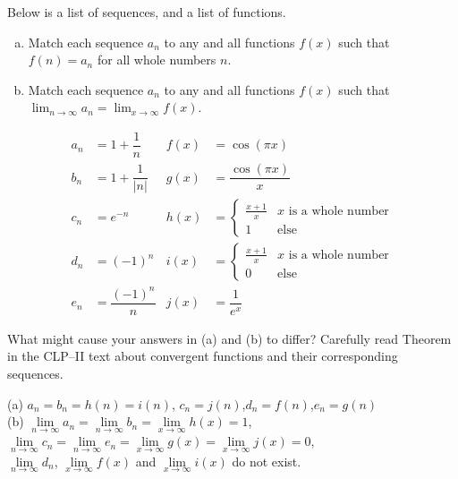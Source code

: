 \begin{Mquestion}
Below is a list of sequences, and a list of functions.
\begin{enumerate}[(a)]
\item Match each sequence $a_n$ to any and all functions $f(x)$ such that $f(n)=a_n$ for all whole numbers $n$.
\item Match each sequence $a_n$ to any and all functions $f(x)$ such that $\displaystyle\lim_{n \to \infty}a_n = \lim_{x \to \infty}f(x)$.
\end{enumerate}
\begin{align*}
a_n &= 1+\dfrac{1}{n} & f(x) &= \cos(\pi x)\\
b_n &= 1+\dfrac{1}{|n|}   & g(x) &= \dfrac{\cos (\pi x)}{x}\\
c_n&=e^{-n}  & h(x)&=\begin{cases}\frac{x+1}{x}&x\text{ is a whole number}\\ 1&\text{else} \end{cases}\\
d_n&=(-1)^n  & i(x)&=\begin{cases}\frac{x+1}{x}&x\text{ is a whole number}\\ 0 & \text{else}\end{cases}\\
e_n&=\dfrac{(-1)^n}{n}  &   j(x)&=\dfrac{1}{e^x}
\end{align*}
\end{Mquestion}
\begin{hint}
What might cause your answers in (a) and (b) to differ? Carefully read Theorem~ in the CLP--II text about convergent functions and their corresponding sequences.
\end{hint}
\begin{answer}
(a) $a_n=b_n=h(n)=i(n)$, \qquad $c_n = j(n)$,\qquad $d_n=f(n)$,\qquad $e_n=g(n)$\\
(b) $\lim\limits_{n \to \infty} a_n=\lim\limits_{n \to \infty} b_n  = \lim\limits_{x \to \infty} h(x)=1$, \qquad $\lim\limits_{n \to \infty} c_n=\lim\limits_{n \to \infty} e_n=\lim\limits_{x \to \infty} g(x) = \lim\limits_{x \to \infty} j(x) =0$,\\
$\lim\limits_{n \to \infty} d_n$,  $\lim\limits_{x\rightarrow\infty} f(x)$  and $\lim\limits_{x\rightarrow\infty} i(x)$ do not exist.
\end{answer}
